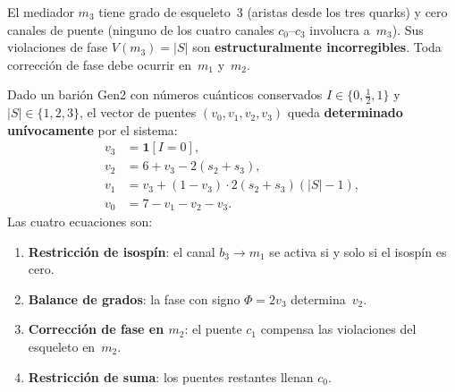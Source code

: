 \documentclass[11pt, a4paper, openany]{book}
\begin{document}
\begin{lemma}[Incorregibilidad de $m_3$]
\label{lem:m3-uncorrect}
El mediador $m_3$ tiene grado de esqueleto~3 (aristas desde los tres
quarks) y cero canales de puente (ninguno de los cuatro canales
$c_0$--$c_3$ involucra a~$m_3$).  Sus violaciones de fase
$V(m_3) = |S|$ son \textbf{estructuralmente incorregibles}.  Toda
correcci\'on de fase debe ocurrir en~$m_1$ y~$m_2$.
\end{lemma}

\begin{theorem}
\label{thm:phase-conservation}
Dado un bari\'on Gen2 con n\'umeros cu\'anticos conservados
$I \in \{0, \tfrac{1}{2}, 1\}$ y $|S| \in \{1, 2, 3\}$, el
vector de puentes $(v_0, v_1, v_2, v_3)$ queda \textbf{determinado
un\'ivocamente} por el sistema:
\begin{align}
  v_3 &= \mathbf{1}[I = 0],
    \tag{A} \label{eq:phase-A} \\
  v_2 &= 6 + v_3 - 2(s_2 + s_3),
    \tag{B} \label{eq:phase-B} \\
  v_1 &= v_3 + (1 - v_3) \cdot 2(s_2 + s_3)(|S| - 1),
    \tag{C} \label{eq:phase-C} \\
  v_0 &= 7 - v_1 - v_2 - v_3.
    \tag{D} \label{eq:phase-D}
\end{align}
Las cuatro ecuaciones son:
\begin{enumerate}
  \item[\eqref{eq:phase-A}] \textbf{Restricci\'on de isosp\'in}: el
    canal $b_3 \to m_1$ se activa si y solo si el isosp\'in es cero.
  \item[\eqref{eq:phase-B}] \textbf{Balance de grados}: la fase con
    signo $\Phi = 2v_3$ determina~$v_2$.
  \item[\eqref{eq:phase-C}] \textbf{Correcci\'on de fase en $m_2$}:
    el puente $c_1$ compensa las violaciones del esqueleto en~$m_2$.
  \item[\eqref{eq:phase-D}] \textbf{Restricci\'on de suma}: los
    puentes restantes llenan $c_0$.
\end{enumerate}
\end{theorem}
\end{document}
